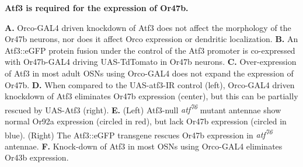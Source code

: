 {\bf Atf3 is required for the expression of Or47b.}

\textbf{A.} Orco-GAL4 driven knockdown of Atf3 does not affect the morphology of the Or47b neurons, nor does it affect Orco expression or dendritic localization.
\textbf{B.} An Atf3::eGFP protein fusion under the control of the Atf3 promoter is co-expressed with Or47b-GAL4 driving UAS-TdTomato in Or47b neurons.
\textbf{C.} Over-expression of Atf3 in most adult OSNs using Orco-GAL4 does not expand the expression of Or47b.
\textbf{D.} When compared to the UAS-atf3-IR control (left), Orco-GAL4 driven knockdown of Atf3 eliminates Or47b expression (center), but this can be partially rescued by UAS-Atf3 (right).
\textbf{E.} (Left) Atf3-null \emph{atf\textsuperscript{76}} mutant antennae show normal Or92a expression (circled in red), but lack Or47b expression (circled in blue). (Right) The Atf3::eGFP transgene rescues Or47b expression in \emph{atf\textsuperscript{76}} antennae.
\textbf{F.} Knock-down of Atf3 in most OSNs using Orco-GAL4 eliminates Or43b expression.
\label{fig:3}
